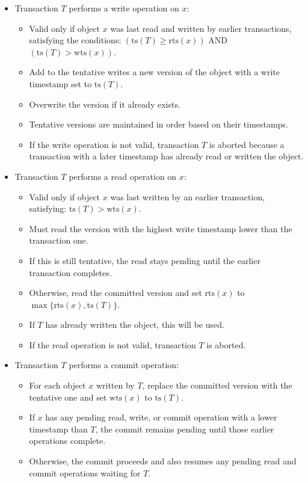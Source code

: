 \begin{itemize}
\item Transaction \( T \) performs a write operation on \( x \):
\begin{itemize}
\item Valid only if object \( x \) was last read and written by earlier transactions, satisfying the conditions: \( (\text{ts}(T) \geq \text{rts}(x)) \) AND \( (\text{ts}(T) > \text{wts}(x)) \).
\item Add to the tentative writes a new version of the object with a write timestamp set to \( \text{ts}(T) \).
\item Overwrite the version if it already exists.
\item Tentative versions are maintained in order based on their timestamps.
\item If the write operation is not valid, transaction \( T \) is aborted because a transaction with a later timestamp has already read or written the object.
\end{itemize}

\item Transaction \( T \) performs a read operation on \( x \):
\begin{itemize}
\item Valid only if object \( x \) was last written by an earlier transaction, satisfying: \( \text{ts}(T) > \text{wts}(x) \).
\item Must read the version with the highest write timestamp lower than the transaction one.
\item If this is still tentative, the read stays pending until the earlier transaction completes.
\item Otherwise, read the committed version and set \( \text{rts}(x) \) to \( \max\{\text{rts}(x), \text{ts}(T)\} \).
\item If \( T \) has already written the object, this will be used.
\item If the read operation is not valid, transaction \( T \) is aborted.
\end{itemize}

\item Transaction \( T \) performs a commit operation:
\begin{itemize}
\item For each object \( x \) written by \( T \), replace the committed version with the tentative one and set \( \text{wts}(x) \) to \( \text{ts}(T) \).
\item If \( x \) has any pending read, write, or commit operation with a lower timestamp than \( T \), the commit remains pending until those earlier operations complete.
\item Otherwise, the commit proceeds and also resumes any pending read and commit operations waiting for \( T \).
\end{itemize}
\end{itemize}


